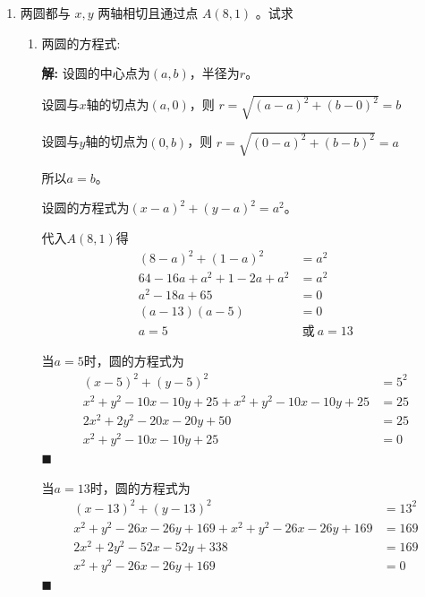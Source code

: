 \documentclass[10pt]{article}
\newcommand{\sol}{\textbf{解:} }
\begin{document}
\begin{enumerate}[leftmargin=*]
  \item 两圆都与 $x, y$ 两轴相切且通过点 $A(8,1)$ 。试求
        \begin{enumerate}
          \item 两圆的方程式:

                \sol{}
                设圆的中心点为$(a, b)$，半径为$r$。

                设圆与$x$轴的切点为$(a, 0)$，则 $r = \sqrt{(a - a)^{2} + (b - 0)^{2}} = b$

                设圆与$y$轴的切点为$(0, b)$，则 $r = \sqrt{(0 - a)^{2} + (b - b)^{2}} = a$

                所以$a = b$。

                设圆的方程式为$(x - a)^{2} + (y - a)^{2} = a^{2}$。

                代入$A(8, 1)$得
                \begin{align*}
                  (8 - a)^{2} + (1 - a)^{2}         & = a^{2}            \\
                  64 - 16a + a^{2} + 1 - 2a + a^{2} & = a^{2}            \\
                  a^{2} - 18a + 65                  & = 0                \\
                  (a - 13)(a - 5)                   & = 0                \\
                  a = 5                             & \ \text{或}\ a = 13
                \end{align*}

                当$a = 5$时，圆的方程式为
                \begin{align*}
                  (x - 5)^{2} + (y - 5)^{2}                                       & = 5^{2} \\
                  x^{2} + y^{2} - 10x - 10y + 25 + x^{2} + y^{2} - 10x - 10y + 25 & = 25    \\
                  2x^{2} + 2y^{2} - 20x - 20y + 50                                & = 25    \\
                  x^{2} + y^{2} - 10x - 10y + 25                                  & = 0
                \end{align*} \hfill$\blacksquare$

                当$a = 13$时，圆的方程式为
                \begin{align*}
                  (x - 13)^{2} + (y - 13)^{2}                                       & = 13^{2} \\
                  x^{2} + y^{2} - 26x - 26y + 169 + x^{2} + y^{2} - 26x - 26y + 169 & = 169    \\
                  2x^{2} + 2y^{2} - 52x - 52y + 338                                 & = 169    \\
                  x^{2} + y^{2} - 26x - 26y + 169                                   & = 0
                \end{align*} \hfill$\blacksquare$


\end{enumerate}
\end{enumerate}
\end{document}
